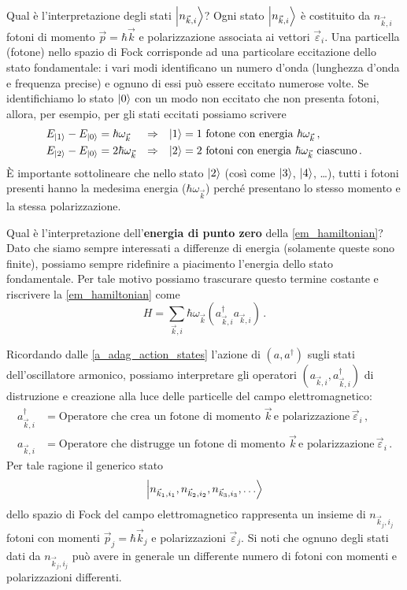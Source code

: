 \noindent Qual è l'interpretazione degli stati $\ket{n_{\vec{k},i}}$? Ogni stato $\ket{n_{\vec{k},i}}$ è costituito da $n_{\vec{k},i}$ fotoni di momento $\vec{p} = \hbar \vec{k}$ e polarizzazione associata ai vettori $\vec{\varepsilon}_i$. Una particella (fotone) nello spazio di Fock corrisponde ad una particolare eccitazione dello stato fondamentale: i vari modi identificano un numero d'onda (lunghezza d'onda e frequenza precise) e ognuno di essi può essere eccitato numerose volte. Se identifichiamo lo stato $\ket{0}$ con un modo non eccitato che non presenta fotoni, allora, per esempio, per gli stati eccitati possiamo scrivere
\begin{align*}
    E_{\ket{1}} - E_{\ket{0}} &= \hbar \omega_{\vec{k}} &\Rightarrow& &\ket{1} &= \text{1 fotone con energia } \hbar \omega_{\vec{k}} \, , \\
    E_{\ket{2}} - E_{\ket{0}} &= 2 \hbar \omega_{\vec{k}} &\Rightarrow& &\ket{2} &= \text{2 fotoni con energia } \hbar \omega_{\vec{k}} \text{ ciascuno} \, .
\end{align*}
È importante sottolineare che nello stato $\ket{2}$ (così come $\ket{3}$, $\ket{4}$, \dots), tutti i fotoni presenti hanno la medesima energia ($\hbar \omega_{\vec{k}}$) perché presentano lo stesso momento e la stessa polarizzazione. 

\noindent Qual è l'interpretazione dell'\textbf{energia di punto zero} della \eqref{em_hamiltonian}? Dato che siamo sempre interessati a differenze di energia (solamente queste sono finite), possiamo sempre ridefinire a piacimento l'energia dello stato fondamentale. Per tale motivo possiamo trascurare questo termine costante e riscrivere la \eqref{em_hamiltonian} come 
\begin{equation*}
    H = \sum_{\vec{k},i} \hbar \omega_{\vec{k}} \left( a^{\dag}_{\vec{k},i} a_{\vec{k},i} \right) \, .
\end{equation*}

\noindent Ricordando dalle \eqref{a_adag_action_states} l'azione di $(a,a^\dag)$ sugli stati dell'oscillatore armonico, possiamo interpretare gli operatori $(a_{\vec{k},i}, a^\dag_{\vec{k},i})$ di distruzione e creazione alla luce delle particelle del campo elettromagnetico:
\begin{align*}
    a^\dag_{\vec{k},i} &= \text{Operatore che crea un fotone di momento } \vec{k} \, \text{e polarizzazione} \, \vec{\varepsilon}_i \, , \\
    a_{\vec{k},i} &= \text{Operatore che distrugge un fotone di momento } \vec{k}\, \text{e polarizzazione} \, \vec{\varepsilon}_i \, .
\end{align*}
Per tale ragione il generico stato 
\begin{equation*}
    \ket{n_{\vec{k}_1, i_1}, n_{\vec{k}_2, i_2}, n_{\vec{k}_3, i_3}, \ldots}
\end{equation*}
dello spazio di Fock del campo elettromagnetico rappresenta un insieme di $n_{\vec{k}_j, i_j}$ fotoni con momenti $\vec{p}_j = \hbar \vec{k}_j$ e polarizzazioni $\vec{\varepsilon}_j$. Si noti che ognuno degli stati dati da $n_{\vec{k}_j, i_j}$ può avere in generale un differente numero di fotoni con momenti e polarizzazioni differenti.

